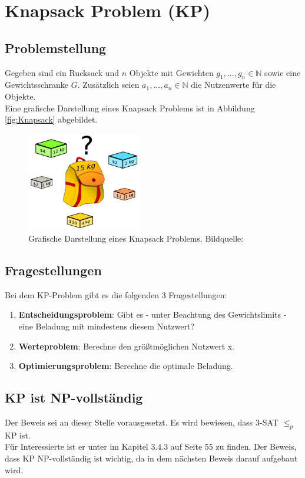 \documentclass[ngerman]{article}
\begin{document}
\section{Knapsack Problem (KP)}
\subsection{Problemstellung}
Gegeben sind ein Rucksack und \(n\) Objekte mit Gewichten \(g_1,...,g_n \in \mathbb{N}\) sowie eine Gewichtsschranke $G$.
Zusätzlich seien \(a_1,...,a_n \in \mathbb{N}\) die Nutzenwerte für die Objekte.\\
Eine grafische Darstellung eines Knapsack Problems ist in Abbildung \vref{fig:Knapsack} abgebildet.

\begin{figure}[H]
	\centering
	\includegraphics[width=5cm]{figures/knapsack.png}
	\caption[Grafische Darstellung eines Knapsack Problems]{Grafische Darstellung eines Knapsack Problems. Bildquelle: \cite{knapSackImage1}}
	\label{fig:Knapsack}
\end{figure}

\subsection{Fragestellungen}
Bei dem KP-Problem gibt es die folgenden 3 Fragestellungen:
\begin{enumerate}
\item \textbf{Entscheidungsproblem}: Gibt es - unter Beachtung des Gewichtslimits - eine Beladung mit mindestens diesem Nutzwert?\\
\item \textbf{Werteproblem}: Berechne den größtmöglichen Nutzwert x.\\
\item \textbf{Optimierungsproblem}: Berechne die optimale Beladung.\\
\end{enumerate}

\subsection{KP ist NP-vollständig}
\label{sec:BeweisKP}
Der Beweis sei an dieser Stelle vorausgesetzt.
Es wird bewiesen, dass 3-SAT \(\le_p\) KP ist.\\
Für Interessierte ist er unter \cite{wegener} im Kapitel 3.4.3 auf Seite 55 zu finden.
Der Beweis, dass KP NP-vollständig ist wichtig, da in dem nächsten Beweis darauf aufgebaut wird.
\end{document}
